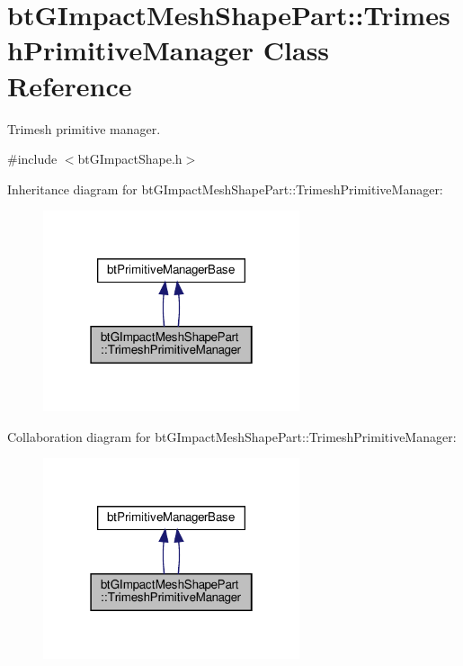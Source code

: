 \hypertarget{classbtGImpactMeshShapePart_1_1TrimeshPrimitiveManager}{}\section{bt\+G\+Impact\+Mesh\+Shape\+Part\+:\+:Trimesh\+Primitive\+Manager Class Reference}
\label{classbtGImpactMeshShapePart_1_1TrimeshPrimitiveManager}


Trimesh primitive manager.  




{\ttfamily \#include $<$bt\+G\+Impact\+Shape.\+h$>$}



Inheritance diagram for bt\+G\+Impact\+Mesh\+Shape\+Part\+:\+:Trimesh\+Primitive\+Manager\+:
\nopagebreak
\begin{figure}[H]
\begin{center}
\leavevmode
\includegraphics[width=214pt]{classbtGImpactMeshShapePart_1_1TrimeshPrimitiveManager__inherit__graph}
\end{center}
\end{figure}


Collaboration diagram for bt\+G\+Impact\+Mesh\+Shape\+Part\+:\+:Trimesh\+Primitive\+Manager\+:
\nopagebreak
\begin{figure}[H]
\begin{center}
\leavevmode
\includegraphics[width=214pt]{classbtGImpactMeshShapePart_1_1TrimeshPrimitiveManager__coll__graph}
\end{center}
\end{figure}
